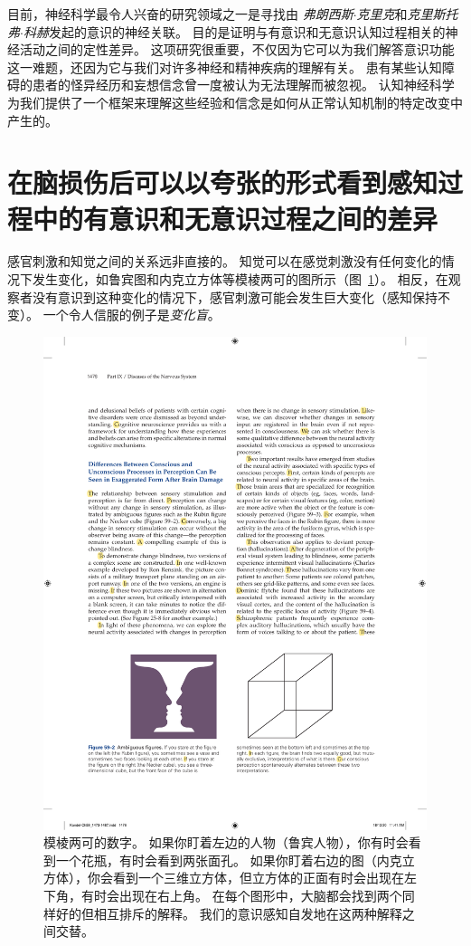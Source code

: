 目前，神经科学最令人兴奋的研究领域之一是寻找由 \textit{弗朗西斯$\cdot$克里克}和\textit{克里斯托弗$\cdot$科赫}发起的意识的神经关联。
目的是证明与有意识和无意识认知过程相关的神经活动之间的定性差异。
这项研究很重要，不仅因为它可以为我们解答意识功能这一难题，还因为它与我们对许多神经和精神疾病的理解有关。
患有某些认知障碍的患者的怪异经历和妄想信念曾一度被认为无法理解而被忽视。
认知神经科学为我们提供了一个框架来理解这些经验和信念是如何从正常认知机制的特定改变中产生的。



\section{在脑损伤后可以以夸张的形式看到感知过程中的有意识和无意识过程之间的差异}

感官刺激和知觉之间的关系远非直接的。
知觉可以在感觉刺激没有任何变化的情况下发生变化，如鲁宾图和内克立方体等模棱两可的图所示（图~\ref{fig:59_2}）。
相反，在观察者没有意识到这种变化的情况下，感官刺激可能会发生巨大变化（感知保持不变）。
一个令人信服的例子是\textit{变化盲}。


\begin{figure}[htbp]
	\centering
	\includegraphics[width=0.7\linewidth]{chap59/fig_59_2}
	\caption{模棱两可的数字。
		如果你盯着左边的人物（鲁宾人物），你有时会看到一个花瓶，有时会看到两张面孔。
		如果你盯着右边的图（内克立方体），你会看到一个三维立方体，但立方体的正面有时会出现在左下角，有时会出现在右上角。
		在每个图形中，大脑都会找到两个同样好的但相互排斥的解释。
		我们的意识感知自发地在这两种解释之间交替。}
	\label{fig:59_2}
\end{figure}


